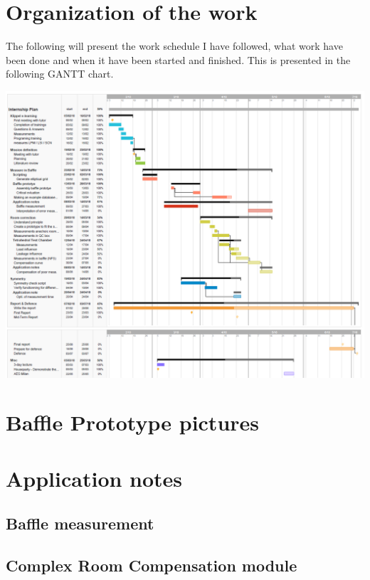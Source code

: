 \documentclass{report}
\begin{document}
\begin{appendices}
\chapter{Organization of the work}

The following will present the work schedule I have followed, what work have been done and when it have been started and finished. This is presented in the following GANTT chart.

\begin{center}
	\includegraphics[width=\textwidth]{Appendix/Plan1} 
\end{center}


\chapter{Baffle Prototype pictures}


\chapter{Application notes}

\section{Baffle measurement}
\label{chap:AN_Baffle}


\section{Complex Room Compensation module}
\label{chap:AN_CRC}


\end{appendices}
\end{document}
